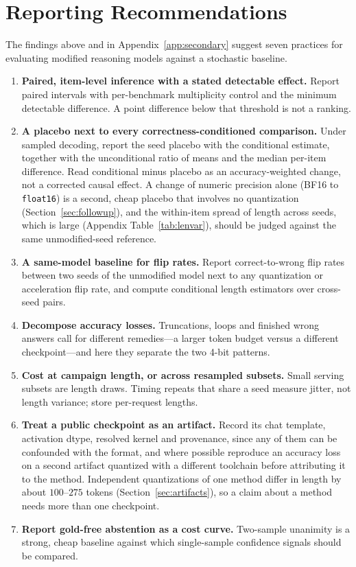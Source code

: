 \documentclass[11pt,a4paper]{article}
\begin{document}
\section{Reporting Recommendations}
\label{sec:recommendations}
The findings above and in Appendix~\ref{app:secondary} suggest seven practices for evaluating modified reasoning models against a stochastic baseline.
\begin{enumerate}
    \item \textbf{Paired, item-level inference with a stated detectable effect.} Report paired intervals with per-benchmark multiplicity control and the minimum detectable difference. A point difference below that threshold is not a ranking.
    \item \textbf{A placebo next to every correctness-conditioned comparison.} Under sampled decoding, report the seed placebo with the conditional estimate, together with the unconditional ratio of means and the median per-item difference. Read conditional minus placebo as an accuracy-weighted change, not a corrected causal effect. A change of numeric precision alone (BF16 to \texttt{float16}) is a second, cheap placebo that involves no quantization (Section~\ref{sec:followup}), and the within-item spread of length across seeds, which is large (Appendix Table~\ref{tab:lenvar}), should be judged against the same unmodified-seed reference.
    \item \textbf{A same-model baseline for flip rates.} Report correct-to-wrong flip rates between two seeds of the unmodified model next to any quantization or acceleration flip rate, and compute conditional length estimators over cross-seed pairs.
    \item \textbf{Decompose accuracy losses.} Truncations, loops and finished wrong answers call for different remedies---a larger token budget versus a different checkpoint---and here they separate the two 4-bit patterns.
    \item \textbf{Cost at campaign length, or across resampled subsets.} Small serving subsets are length draws. Timing repeats that share a seed measure jitter, not length variance; store per-request lengths.
    \item \textbf{Treat a public checkpoint as an artifact.} Record its chat template, activation dtype, resolved kernel and provenance, since any of them can be confounded with the format, and where possible reproduce an accuracy loss on a second artifact quantized with a different toolchain before attributing it to the method. Independent quantizations of one method differ in length by about $100$--$275$ tokens (Section~\ref{sec:artifacts}), so a claim about a method needs more than one checkpoint.
    \item \textbf{Report gold-free abstention as a cost curve.} Two-sample unanimity is a strong, cheap baseline against which single-sample confidence signals should be compared.
\end{enumerate}
\end{document}
